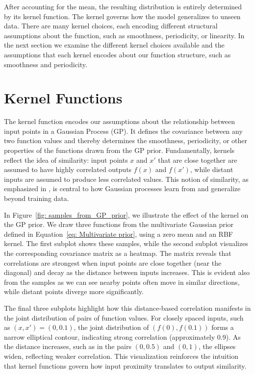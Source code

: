 \documentclass{ucdgradtaughtthesis}
\begin{document}
After accounting for the mean, the resulting distribution is entirely determined by its kernel function.
The kernel governs how the model generalizes to unseen data. There are many kernel choices, each encoding different structural assumptions about the function, such as smoothness, periodicity, or linearity.
In the next section we examine the different kernel choices available and the assumptions that each kernel encodes about our function structure, such as smoothness and periodicity.



\section{Kernel Functions}
\label{sec: Kernels}
The kernel function encodes our assumptions about the relationship between input points in a Gaussian Process (GP).
It defines the covariance between any two function values and thereby determines the smoothness, periodicity, or other properties of the functions drawn from the GP prior.
Fundamentally, kernels reflect the idea of similarity: input points \( x \) and \( x' \) that are close together are assumed to have highly correlated outputs \( f(x) \) and \( f(x') \),
while distant inputs are assumed to produce less correlated values. This notion of similarity, as emphasized in \cite[p.~79]{bible}, is central to how Gaussian processes learn from and generalize beyond training data.
%

In Figure~\ref{fig: samples_from_GP_prior}, we illustrate the effect of the kernel on the GP prior.
We draw three functions from the multivariate Gaussian prior defined in Equation~\ref{eq: Multivariate prior}, using a zero mean and an RBF kernel.
The first subplot shows these samples, while the second subplot visualizes the corresponding covariance matrix as a heatmap.
The matrix reveals that correlations are strongest when input points are close together (near the diagonal) and decay as the distance between inputs increases.
This is evident also from the samples as we can see nearby points often move in similar directions, while distant points diverge more significantly.
%

The final three subplots highlight how this distance-based correlation manifests in the joint distribution of pairs of function values.
For closely spaced inputs, such as \( (x, x') = (0, 0.1) \), the joint distribution of \( (f(0), f(0.1)) \) forms a narrow elliptical contour,
indicating strong correlation (approximately 0.9). As the distance increases, such as in the pairs \( (0, 0.5) \) and \( (0, 1) \), the ellipses widen, reflecting weaker correlation. This visualization reinforces the intuition that kernel functions govern how input proximity translates to output similarity.
\end{document}

